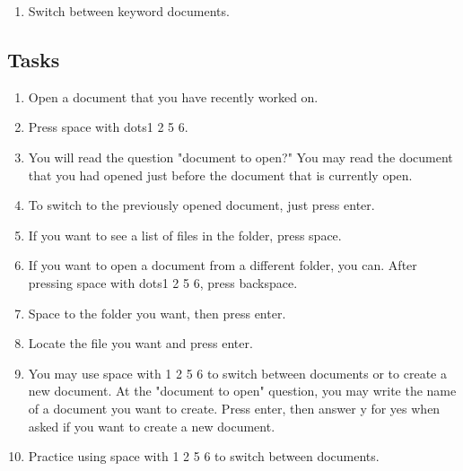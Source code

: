 \documentclass[10pt,letterpaper,twoside]{report}
\begin{document}
{{{{\begin{enumerate}
	\item Switch between keyword documents.
\end{enumerate}



 \subsection{Tasks}



\begin{enumerate}
	\item Open a document that you have recently worked on.
	      
	\item Press space with dots1 2 5 6.
	      
	\item You will read the question "document to open?" You may read the document that you had opened just before the document that is currently open.
	      
	\item To switch to the previously opened document, just press enter.
	      
	\item If you want to see a list of files in the folder, press space.
	      
	\item If you want to open a document from a different folder, you can.  After pressing space with dots1 2 5 6, press backspace.
	      
	\item Space to the folder you want, then press enter.
	      
	\item Locate the file you want and press enter.
	      
	\item You may use space with 1 2 5 6 to switch between documents or to create a new document.  At the "document to open" question, you may write the name of a document you want to create.  Press enter, then answer y for yes when asked if you want to create a new document.
	      
	\item Practice using space with 1 2 5 6 to switch between documents.
\end{enumerate}





\clearpage

}}}}
\end{document}
